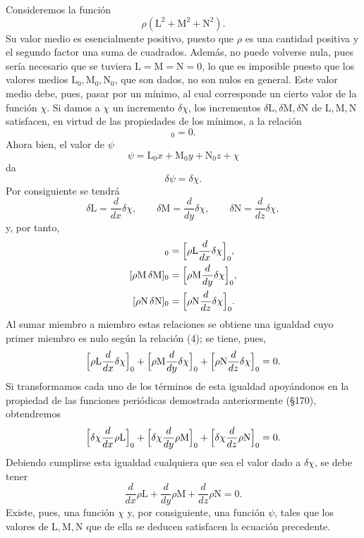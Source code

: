 Consideremos la función
\[
\rho(\mathrm L^2+\mathrm M^2+\mathrm N^2).
\]
Su valor medio es esencialmente positivo, puesto que $\rho$ es una
cantidad positiva y el segundo factor una suma de cuadrados. Además, no
puede volverse nula, pues sería necesario que se tuviera
$\mathrm L=\mathrm M=\mathrm N=0$, lo que es imposible puesto que los
valores medios $\mathrm L_0,\mathrm M_0,\mathrm N_0$, que son dados, no son
nulos en general. Este valor medio debe, pues, pasar por un mínimo, al
cual corresponde un cierto valor de la función $\chi$. Si damos a $\chi$ un
incremento $\delta\chi$, los incrementos $\delta \mathrm L,\delta \mathrm
M,\delta \mathrm N$ de $\mathrm L,\mathrm M,\mathrm N$ satisfacen, en
virtud de las propiedades de los mínimos, a la relación
\begin{equation}
[\rho(\mathrm L\,\delta \mathrm L+\mathrm M\,\delta \mathrm M+\mathrm N\,\delta \mathrm N)]_0=0.
\tag{4}
\end{equation}
Ahora bien, el valor de $\psi$
\[
\psi=\mathrm L_0x+\mathrm M_0y+\mathrm N_0z+\chi
\]
da
\[
\delta\psi=\delta\chi.
\]
Por consiguiente se tendrá
\[
\delta \mathrm L=\frac{d}{dx}\delta\chi,\qquad
\delta \mathrm M=\frac{d}{dy}\delta\chi,\qquad
\delta \mathrm N=\frac{d}{dz}\delta\chi,
\]
y, por tanto,
\begin{align*}
[\rho \mathrm L\,\delta \mathrm L]_0&=\Bigl[\rho \mathrm L\frac{d}{dx}\delta\chi\Bigr]_0,\\
[\rho \mathrm M\,\delta \mathrm M]_0&=\Bigl[\rho \mathrm M\frac{d}{dy}\delta\chi\Bigr]_0,\\
[\rho \mathrm N\,\delta \mathrm N]_0&=\Bigl[\rho \mathrm N\frac{d}{dz}\delta\chi\Bigr]_0.
\end{align*}
Al sumar miembro a miembro estas relaciones se obtiene una igualdad cuyo
primer miembro es nulo según la relación (4); se tiene, pues,
\[
\Bigl[\rho \mathrm L\frac{d}{dx}\delta\chi\Bigr]_0+\Bigl[\rho \mathrm M\frac{d}{dy}\delta\chi\Bigr]_0
+\Bigl[\rho \mathrm N\frac{d}{dz}\delta\chi\Bigr]_0=0.
\]
Si transformamos cada uno de los términos de esta igualdad apoyándonos en
la propiedad de las funciones periódicas demostrada anteriormente (§170),
obtendremos
\[
\Bigl[\delta\chi\frac{d}{dx}\rho \mathrm L\Bigr]_0+\Bigl[\delta\chi\frac{d}{dy}\rho \mathrm M\Bigr]_0
+\Bigl[\delta\chi\frac{d}{dz}\rho \mathrm N\Bigr]_0=0.
\]
Debiendo cumplirse esta igualdad cualquiera que sea el valor dado a
$\delta\chi$, se debe tener
\begin{equation}
\frac{d}{dx}\rho \mathrm L+\frac{d}{dy}\rho \mathrm M+\frac{d}{dz}\rho \mathrm N=0.
\tag{5}
\end{equation}
Existe, pues, una función $\chi$ y, por consiguiente, una función $\psi$,
tales que los valores de $\mathrm L,\mathrm M,\mathrm N$ que de ella se
deducen satisfacen la ecuación precedente.


